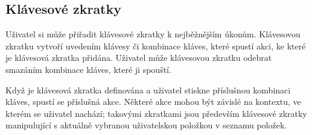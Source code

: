 \subsection{Klávesové zkratky}

Uživatel si může přiřadit klávesové zkratky k nejběžnějším úkonům.
Klávesovou zkratku vytvoří uvedením klávesy či kombinace kláves, které spustí akci, ke které je klávesová zkratka přidána.
Uživatel může klávesovou zkratku odebrat smazáním kombinace kláves, které ji spouští.

Když je klávesová zkratka definována a uživatel stiskne příslušnou kombinaci kláves, spustí se příslušná akce.
Některé akce mohou být závislé na kontextu, ve kterém se uživatel nachází; takovými zkratkami jsou především klávesové zkratky manipulující s aktuálně vybranou uživatelskou položkou v seznamu položek.
